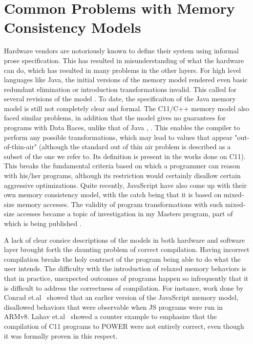 \documentclass{article}
\begin{document}
        \section{Common Problems with Memory Consistency Models}

        Hardware vendors are notoriously known to define their system using informal prose specification.
        This has resulted in misunderstanding of what the hardware can do, which has resulted in many problems in the other layers\cite{OwensS}.
        For high level languages like Java, the initial versions of the memory model rendered even basic redundant elimination or introduction transformations invalid. This called for several revisions of the model \cite{JeremyM}. To date, the specificaiton of the Java memory model is still not completely clear and formal\cite{BenderJ}. 
        The C11/C++ memory model also faced similar problems, in addition that the model gives no guarantees for programs with Data Races, unlike that of Java \cite{BattyM}, \cite{VafeiadisV}. 
        This enables the compiler to perform any possible transformations, which  may lead to values that appear "out-of-thin-air" (although the standard out of thin air problem is described as a subset of the one we refer to. Its definition is present in the works done on C11). 
        This breaks the fundamental criteria based on which a programmer can reason with his/her programs, although its restriction would certainly disallow certain aggressive optimizations\cite{Verbrugge}. 
        Quite recently, JavaScript have also come up with their own memory consistency model, with the catch being that it is based on mixed-size memory accesses. 
        The validity of program transformations with such mixed-size accesses became a topic of investigation in my Masters program, part of which is being published \cite{Akshay}.  
        
        A lack of clear consice descriptions of the models in both hardware and software layer brought forth the daunting problem of correct compilation.
        Having incorrect compilation breaks the holy contract of the program being able to do what the user intends.
        The difficulty with the introduction of relaxed memory behaviors is that in practice, unexpected outcomes of programs happen so infrequently that it is difficult to address the correctness of compilation.   
        For instance, work done by Conrad et.al~\cite{WattC} showed that an earlier version of the JavaScript memory model, disallowed behaviors that were observable when JS programs were run in ARMv8.
        Lahav et.al~\cite{Lahav} showed a counter example to emphasize that the compilation of C11 programs to POWER were not entirely correct, even though it was formally proven in this respect.
\end{document}
